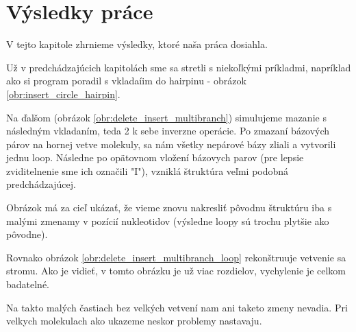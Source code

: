 
\chapter{Výsledky práce}

V tejto kapitole zhrnieme výsledky, ktoré naša práca dosiahla.

Už v predchádzajúcich kapitolách sme sa stretli s niekoľkými príkladmi, napríklad ako si
program poradil s vkladaíim do hairpinu - obrázok \ref{obr:insert_circle_hairpin}.

Na ďalšom (obrázok \ref{obr:delete_insert_multibranch}) simulujeme mazanie s následným vkladaním,
teda 2 k sebe inverzne operácie. Po zmazaní bázových párov na hornej vetve molekuly, sa nám všetky
nepárové bázy zliali a vytvorili jednu loop. Následne po opätovnom vložení bázovych parov (pre lepsie
zviditelnenie sme ich označili "I"), vzniklá štruktúra veľmi podobná predchádzajúcej.

Obrázok má za cieľ ukázať, že vieme znovu nakresliť pôvodnu štruktúru iba s malými zmenamy v pozícií
nukleotidov (výsledne loopy sú trochu plytšie ako pôvodne).

Rovnako obrázok \ref{obr:delete_insert_multibranch_loop} rekonštruuje vetvenie sa stromu. Ako je vidieť,
v tomto obrázku je už viac rozdielov, vychylenie je celkom badatelné.

Na takto malých častiach bez velkých vetvení nam ani taketo zmeny nevadia. Pri velkych molekulach
ako ukazeme neskor problemy nastavaju.

